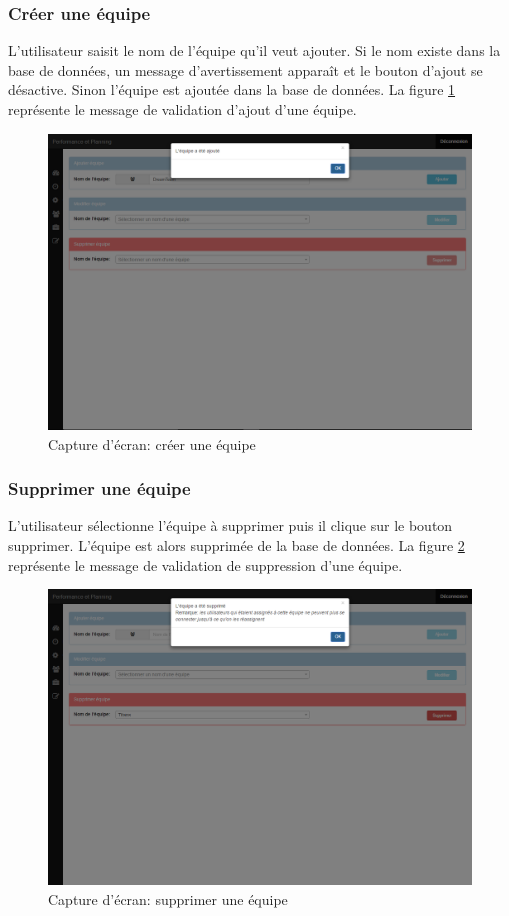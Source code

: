 \subsubsection{Créer une équipe}
L'utilisateur saisit le nom de l'équipe qu'il veut ajouter. Si le nom existe dans la base de données, un message d'avertissement apparaît et le bouton d'ajout se désactive. Sinon l'équipe est ajoutée dans la base de données. La figure \ref{code87} représente le message de validation d'ajout d'une équipe.
\begin{figure}[H]
  \centering
 \includegraphics[scale=0.37]{figures/printscreen_app/4_2.PNG}
 \caption{Capture d'écran: créer une équipe}
 \label{code87}
\end{figure}

\subsubsection{Supprimer une équipe}
L'utilisateur sélectionne l'équipe à supprimer puis il clique sur le bouton supprimer. L'équipe est alors supprimée de la base de données. La figure \ref{code88} représente le message de validation de suppression d'une équipe.
\begin{figure}[H]
  \centering
 \includegraphics[scale=0.37]{figures/printscreen_app/5_3.PNG}
 \caption{Capture d'écran: supprimer une équipe}
 \label{code88}
\end{figure}


